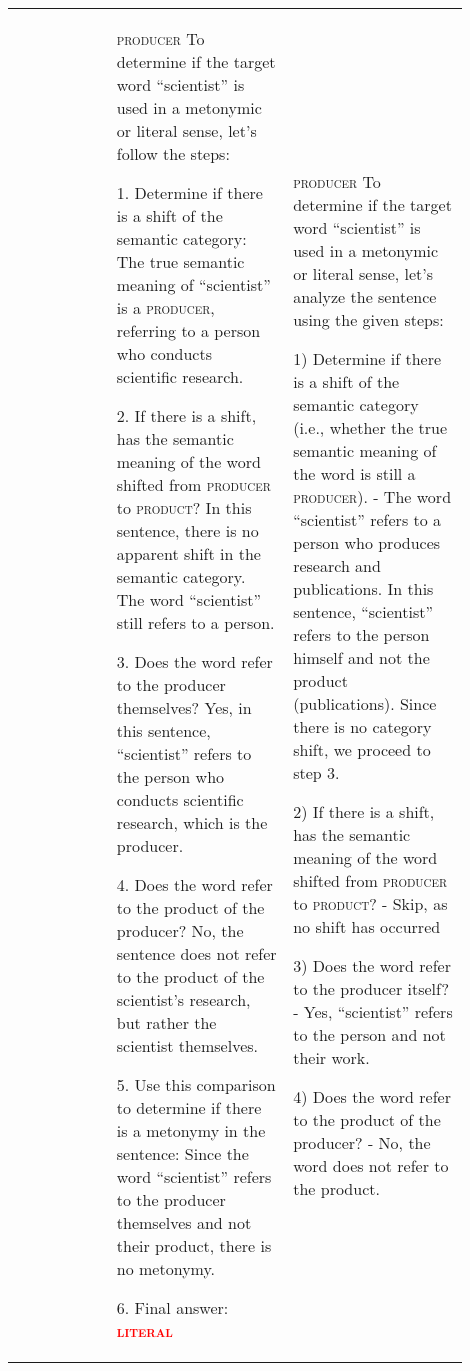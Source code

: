 \documentclass[11pt]{article}
\newcommand{\tr}[1]{\textcolor{red}{#1}}
\begin{document}
{\begin{longtable}{|p{0.20\linewidth}|p{0.35\linewidth}|p{0.35\linewidth}|}
&
       
\textsc{producer} \newline
To determine if the target word ``scientist'' is used in a metonymic or literal sense, let's follow the steps:

1. Determine if there is a shift of the semantic category: The true semantic meaning of ``scientist'' is a \textsc{producer}, referring to a person who conducts scientific research.

2. If there is a shift, has the semantic meaning of the word shifted from \textsc{producer} to \textsc{product}? In this sentence, there is no apparent shift in the semantic category. The word ``scientist'' still refers to a person.

3. Does the word refer to the producer themselves? Yes, in this sentence, ``scientist'' refers to the person who conducts scientific research, which is the producer.

4. Does the word refer to the product of the producer? No, the sentence does not refer to the product of the scientist's research, but rather the scientist themselves.

5. Use this comparison to determine if there is a metonymy in the sentence: Since the word ``scientist'' refers to the producer themselves and not their product, there is no metonymy.

6. Final answer: \tr{\textsc{\textbf{literal}}}

&

\textsc{producer} \newline
To determine if the target word ``scientist'' is used in a metonymic or literal sense, let's analyze the sentence using the given steps:

1) Determine if there is a shift of the semantic category (i.e., whether the true semantic meaning of the word is still a \textsc{producer}). - The word ``scientist'' refers to a person who produces research and publications. In this sentence, ``scientist'' refers to the person himself and not the product (publications). Since there is no category shift, we proceed to step 3.

2) If there is a shift, has the semantic meaning of the word shifted from \textsc{producer} to \textsc{product}? - Skip, as no shift has occurred

3) Does the word refer to the producer itself? - Yes, ``scientist'' refers to the person and not their work.

4) Does the word refer to the product of the producer? - No, the word does not refer to the product.


\end{longtable}}
\end{document}
